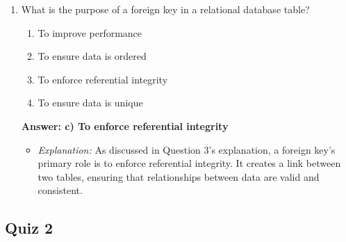 \documentclass{article}
\begin{document}
\begin{enumerate}[label=\textbf{Question \arabic*.}]
    \item What is the purpose of a foreign key in a relational database table?
        \begin{enumerate}[label=\alph*)]
            \item To improve performance
            \item To ensure data is ordered
            \item To enforce referential integrity
            \item To ensure data is unique
        \end{enumerate}
        \textbf{Answer: c) To enforce referential integrity}
        \begin{itemize}
            \item \textit{Explanation:} As discussed in Question 3's explanation, a foreign key's primary role is to enforce referential integrity. It creates a link between two tables, ensuring that relationships between data are valid and consistent.
        \end{itemize}
    
    \end{enumerate}    

\subsection*{Quiz 2}
\end{document}

